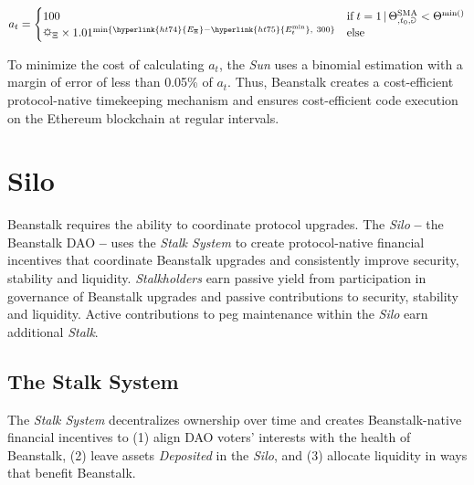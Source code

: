 \documentclass[tikz]{article}
\newcommand{\term}[1]{\textsl{#1}}
\newcommand{\bean}{} %
\begin{document}
    $$ 
        a_t =
        \begin{cases}
            {100} 
                & \text{if} \; t = 1 \mkern3mu | \mkern3mu \Theta^{\text{SMA}}_{\bean,t_0,\Game} < \Theta^{\text{min}(\bean)}  \\
            {\sun_{\Xi} \times 1.01^{\text{min}\{{\hyperlink{ht74}{E_\Xi} - \hyperlink{ht75}{E_{t}^{\text{min}}}},\ 300\}}} 
                & \text{else}
        \end{cases} 
    $$

To minimize the cost of calculating \hyperlink{ht11}{$a_t$}, the \term{Sun} uses a binomial estimation with a margin of error of less than 0.05\% of \hyperlink{ht11}{$a_t$}. Thus, Beanstalk creates a cost-efficient protocol-native timekeeping mechanism and ensures cost-efficient code execution on the Ethereum blockchain at regular intervals.


\vspace*{-1mm}
\section{Silo}
\vspace*{-1mm}

Beanstalk requires the ability to coordinate protocol upgrades. The \term{Silo} \textbf{--} the Beanstalk DAO \textbf{--} uses the \term{Stalk System} to create protocol-native financial incentives that coordinate Beanstalk upgrades and consistently improve security, stability and liquidity. \term{Stalkholders} earn passive yield from participation in governance of Beanstalk upgrades and passive contributions to security, stability and liquidity. Active contributions to peg maintenance within the \term{Silo} earn additional \term{Stalk}.


\vspace*{-1.3mm}
\subsection{The Stalk System}
\vspace*{-1.3mm}

The \term{Stalk System} decentralizes ownership over time and creates Beanstalk-native financial incentives to (1) align DAO voters' interests with the health of Beanstalk, (2) leave assets \term{Deposited} in the \term{Silo}, and (3) allocate liquidity in ways that benefit Beanstalk.
\end{document}
